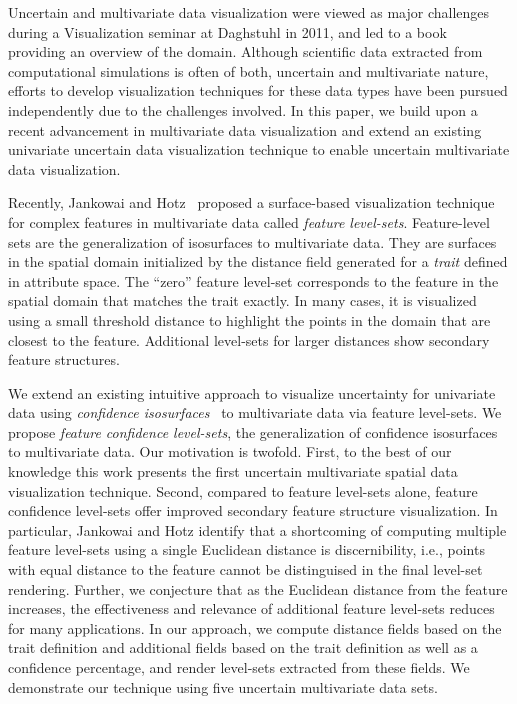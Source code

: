 Uncertain and multivariate data visualization were viewed as major challenges during a Visualization seminar at Daghstuhl in 2011, and led to a book~\cite{hansen2014scientific} providing an overview of the domain. 
%
Although scientific data extracted from computational simulations is often of both, uncertain and multivariate nature, efforts to develop visualization techniques for these data types have been pursued independently due to the challenges involved.
%
In this paper, we build upon a recent advancement in multivariate data visualization and extend an existing univariate uncertain data visualization technique to enable uncertain multivariate data visualization.

Recently, Jankowai and Hotz~\cite{jankowai2020feature} proposed a surface-based visualization technique for complex features in multivariate data called \textit{feature level-sets}. 
%
Feature-level sets are the generalization of isosurfaces to multivariate data.
%
They are surfaces in the spatial domain initialized by the distance field generated for a \textit{trait} defined in attribute space.
%
The ``zero'' feature level-set corresponds to the feature in the spatial domain that matches the trait exactly.
%
In many cases, it is visualized using a small threshold distance to highlight the points in the domain that are closest to the feature.
%
Additional level-sets for larger distances show secondary feature structures.
%


We extend an existing intuitive approach to visualize uncertainty for univariate data using \textit{confidence isosurfaces}~\cite{zehner2010visualization} to multivariate data via feature level-sets.
%
We propose \textit{feature confidence level-sets}, the generalization of confidence isosurfaces to multivariate data.
%
Our motivation is twofold.
%
First, to the best of our knowledge this work presents the first uncertain multivariate spatial data visualization technique. 
%
Second, compared to feature level-sets alone, feature confidence level-sets offer improved secondary feature structure visualization.
%
In particular, Jankowai and Hotz identify that a shortcoming of computing multiple feature level-sets using a single Euclidean distance is discernibility, i.e., points with equal distance to the feature cannot be distinguised in the final level-set rendering.
Further, we conjecture that as the Euclidean distance from the feature increases, the effectiveness and relevance of additional feature level-sets reduces for many applications.
In our approach, we compute distance fields based on the trait definition and additional fields based on the trait definition as well as a confidence percentage, and render level-sets extracted from these fields.
We demonstrate our technique using five uncertain multivariate data sets.

